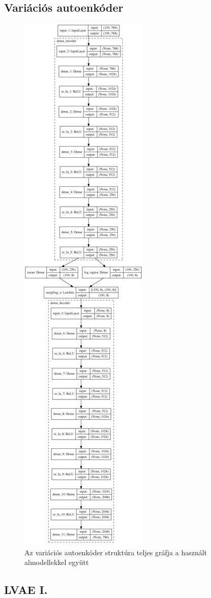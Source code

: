 \documentclass[12pt, english]{article}
\begin{document}
\subsection*{Variációs autoenkóder}
\label{sec:vae}

\begin{figure}[H]
    \centering
    \includegraphics[width=0.2\linewidth]{DenseVAE_vertical.png} 
    \caption{Az variációs autoenkóder struktúra teljes gráfja a használt almodellekkel együtt} 
    \label{fig:suru-variational-auto-encoder}
\end{figure}

\subsection*{LVAE I.}
\label{sec:lvae1}
\end{document}
